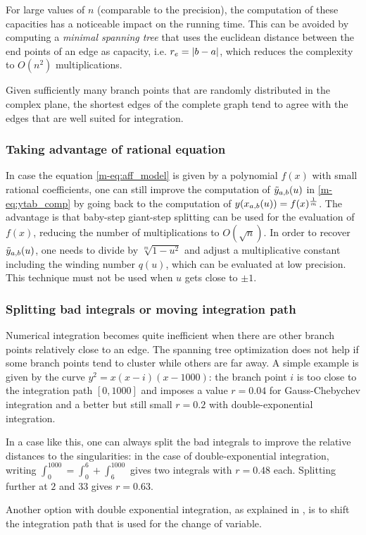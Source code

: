 \documentclass[main.tex]{subfiles}
\begin{document}
    For large values of $n$ (comparable to the precision), the computation of
    these capacities has a noticeable impact on the running time. This can be
    avoided by computing a \emph{minimal spanning tree} that uses the euclidean
    distance between the end points of an edge as capacity, i.e.
    $r_e = \left|b-a\right|$, which reduces the complexity to $O(n^2)$
    multiplications.

    Given sufficiently many branch points that are randomly distributed in the
    complex plane, the shortest edges of the complete graph tend to agree with
    the edges that are well suited for integration.

    \subsubsection{Taking advantage of rational equation}

    In case the equation \eqref{m-eq:aff_model} is given by a polynomial $f(x)$
    with small rational coefficients, one can still improve the computation
    of $\tilde{y}_{a,b}(u)$ in \eqref{m-eq:ytab_comp} by going back to
    the computation of $y(x_{a,b}(u))=f(x)^{\frac1m}$.
    The advantage is that baby-step giant-step splitting can be used for
    the evaluation of $f(x)$, reducing the number of multiplications to
    $O(\sqrt{n})$. In order to recover $\tilde{y}_{a,b}(u)$, one needs to divide by
    $\sqrt[m]{1-u^2}$ and adjust a multiplicative constant including
    the winding number $q(u)$, which can be evaluated at low precision.
    This technique must not be used when $u$ gets close to $\pm1$.

    \subsubsection{Splitting bad integrals or moving integration path}
    \label{subsubsec:splitting}

    Numerical integration becomes quite inefficient when there are other branch points
    relatively close to an edge. The spanning tree optimization does not help
    if some branch points tend to cluster while others are far away. A simple
    example is given by the curve $y^2=x(x-i)(x-1000)$: the
    branch point $i$ is too close to the integration path $[0,1000]$
    and imposes a value $r=0.04$ for Gauss-Chebychev integration and
    a better but still small $r=0.2$ with double-exponential integration.

    In a case like this, one can always split the bad integrals to improve the
    relative distances to the singularities: in the case of double-exponential
    integration, writing
    $\int_0^{1000}=\int_{0}^{6}+\int_6^{1000}$ gives two integrals with
    $r=0.48$ each. Splitting further at $2$ and $33$ gives $r=0.63$.

    Another option with double exponential integration,  as explained in \cite[II.3.5]{Molin2010}, is to shift
    the integration path that is used for the change of variable.

\biblio
\end{document}

